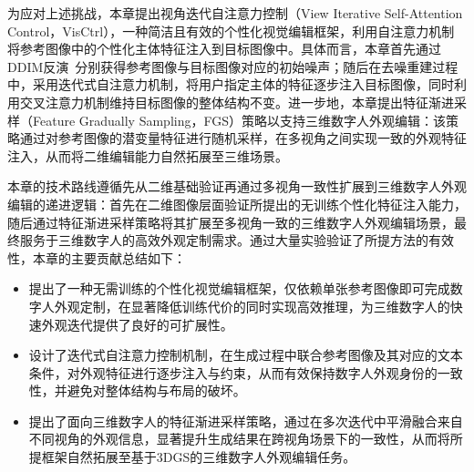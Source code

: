 
为应对上述挑战，本章提出视角迭代自注意力控制（View Iterative Self-Attention Control，VisCtrl），一种简洁且有效的个性化视觉编辑框架，利用自注意力机制将参考图像中的个性化主体特征注入到目标图像中。具体而言，本章首先通过DDIM反演~\cite{song2021ddim}分别获得参考图像与目标图像对应的初始噪声；随后在去噪重建过程中，采用迭代式自注意力机制，将用户指定主体的特征逐步注入目标图像，同时利用交叉注意力机制维持目标图像的整体结构不变。进一步地，本章提出特征渐进采样（Feature Gradually Sampling，FGS）策略以支持三维数字人外观编辑：该策略通过对参考图像的潜变量特征进行随机采样，在多视角之间实现一致的外观特征注入，从而将二维编辑能力自然拓展至三维场景。

本章的技术路线遵循先从二维基础验证再通过多视角一致性扩展到三维数字人外观编辑的递进逻辑：首先在二维图像层面验证所提出的无训练个性化特征注入能力，随后通过特征渐进采样策略将其扩展至多视角一致的三维数字人外观编辑场景，最终服务于三维数字人的高效外观定制需求。通过大量实验验证了所提方法的有效性，本章的主要贡献总结如下：

\begin{itemize}
\item 提出了一种无需训练的个性化视觉编辑框架，仅依赖单张参考图像即可完成数字人外观定制，在显著降低训练代价的同时实现高效推理，为三维数字人的快速外观迭代提供了良好的可扩展性。

\item 设计了迭代式自注意力控制机制，在生成过程中联合参考图像及其对应的文本条件，对外观特征进行逐步注入与约束，从而有效保持数字人外观身份的一致性，并避免对整体结构与布局的破坏。

\item 提出了面向三维数字人的特征渐进采样策略，通过在多次迭代中平滑融合来自不同视角的外观信息，显著提升生成结果在跨视角场景下的一致性，从而将所提框架自然拓展至基于3DGS的三维数字人外观编辑任务。

\end{itemize}

